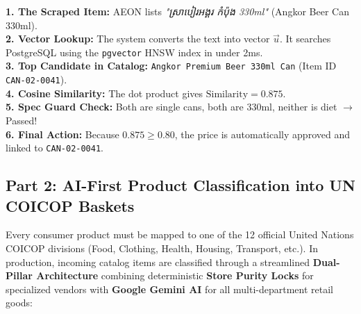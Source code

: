 \documentclass[11pt,a4paper,oneside]{article}
\newcommand{\khmer}[1]{{\khmerfont #1}}
\begin{document}
\begin{tcolorbox}[colback=white,colframe=NavyBlue,title=\textbf{Step-by-Step Example: Matching an Angkor Beer Can}]
\textbf{1. The Scraped Item:} AEON lists \textit{"\khmer{ស្រាបៀរអង្គរ កំប៉ុង} 330ml"} (Angkor Beer Can 330ml).\\
\textbf{2. Vector Lookup:} The system converts the text into vector $\vec{u}$. It searches PostgreSQL using the \texttt{pgvector} HNSW index in under 2ms.\\
\textbf{3. Top Candidate in Catalog:} \texttt{Angkor Premium Beer 330ml Can} (Item ID \texttt{CAN-02-0041}).\\
\textbf{4. Cosine Similarity:} The dot product gives $\text{Similarity} = \mathbf{0.875}$.\\
\textbf{5. Spec Guard Check:} Both are single cans, both are 330ml, neither is diet $\rightarrow$ Passed!\\
\textbf{6. Final Action:} Because $0.875 \ge 0.80$, the price is automatically approved and linked to \texttt{CAN-02-0041}.
\end{tcolorbox}

\subsection{Part 2: AI-First Product Classification into UN COICOP Baskets}
Every consumer product must be mapped to one of the 12 official United Nations COICOP divisions (Food, Clothing, Health, Housing, Transport, etc.). In production, incoming catalog items are classified through a streamlined \textbf{Dual-Pillar Architecture} combining deterministic \textbf{Store Purity Locks} for specialized vendors with \textbf{Google Gemini AI} for all multi-department retail goods:
\end{document}
